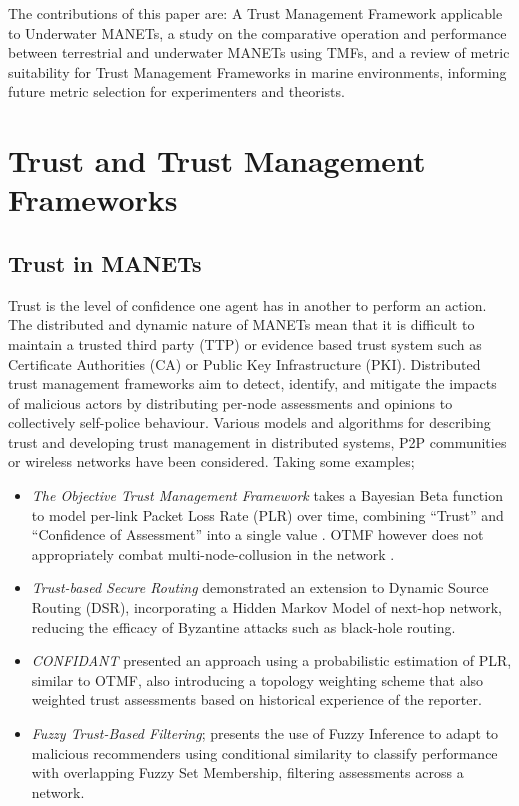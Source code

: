 \documentclass[runningheads,a4paper]{llncs}
\begin{document}
The contributions of this paper are: A Trust Management Framework applicable to Underwater MANETs, a study on the comparative operation and performance between terrestrial and underwater MANETs using TMFs, and a review of metric suitability for Trust Management Frameworks in marine environments, informing future metric selection for experimenters and theorists.

\section{Trust and Trust Management Frameworks}\label{sec:trustandtmfs}

\subsection{Trust in MANETs}\label{sec:trustinmanets}

Trust is the level of confidence one agent has in another to perform an action. 
The distributed and dynamic nature of MANETs mean that it is difficult to maintain a trusted third party (TTP) or evidence based trust system such as Certificate Authorities (CA) or Public Key Infrastructure (PKI).
Distributed trust management frameworks aim to detect, identify, and mitigate the impacts of malicious actors by distributing per-node assessments and opinions to collectively self-police behaviour.
Various models and algorithms for describing trust and developing trust management in distributed systems, P2P communities or wireless networks have been considered.
Taking some examples;

\begin{itemize}
  \item \emph{The Objective Trust Management Framework} takes a Bayesian Beta function to model per-link Packet Loss Rate (PLR) over time, combining ``Trust'' and ``Confidence of Assessment'' into a single value \cite{Li2008}.
    OTMF however does not appropriately combat multi-node-collusion in the network \cite{Cho2011}.
  \item \emph{Trust-based Secure Routing}\cite{Moe2008a} demonstrated an extension to Dynamic Source Routing (DSR), incorporating a Hidden Markov Model of next-hop network, reducing the efficacy of Byzantine attacks such as black-hole routing.
  \item \emph{CONFIDANT}\cite{Buchegger2002} presented an approach using a probabilistic estimation of PLR, similar to OTMF, also introducing a topology weighting scheme that also weighted trust assessments based on historical experience of the reporter.
  \item \emph{Fuzzy Trust-Based Filtering}; \cite{Luo2008} presents the use of Fuzzy Inference to adapt to malicious recommenders using conditional similarity to classify performance with overlapping Fuzzy Set Membership, filtering assessments across a network.
\end{itemize}
\end{document}
